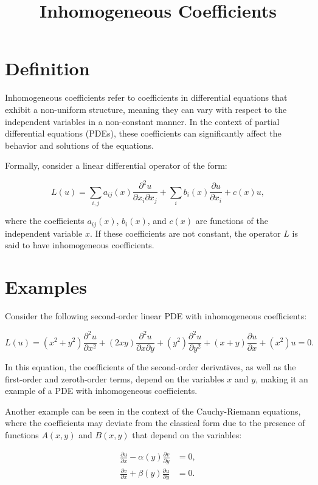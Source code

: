 \documentclass[11pt,a4paper]{article}
\title{Inhomogeneous Coefficients}
\date{}
\begin{document}
\maketitle
\section{Definition}
Inhomogeneous coefficients refer to coefficients in differential equations that exhibit a non-uniform structure, meaning they can vary with respect to the independent variables in a non-constant manner. In the context of partial differential equations (PDEs), these coefficients can significantly affect the behavior and solutions of the equations. 

Formally, consider a linear differential operator of the form:

$$
L(u) = \sum_{i,j} a_{ij}(x) \frac{\partial^2 u}{\partial x_i \partial x_j} + \sum_{i} b_i(x) \frac{\partial u}{\partial x_i} + c(x) u,
$$

where the coefficients $a_{ij}(x)$, $b_i(x)$, and $c(x)$ are functions of the independent variable $x$. If these coefficients are not constant, the operator $L$ is said to have inhomogeneous coefficients.

\section{Examples}
Consider the following second-order linear PDE with inhomogeneous coefficients:

$$
L(u) = (x^2 + y^2) \frac{\partial^2 u}{\partial x^2} + (2xy) \frac{\partial^2 u}{\partial x \partial y} + (y^2) \frac{\partial^2 u}{\partial y^2} + (x + y) \frac{\partial u}{\partial x} + (x^2) u = 0.
$$

In this equation, the coefficients of the second-order derivatives, as well as the first-order and zeroth-order terms, depend on the variables $x$ and $y$, making it an example of a PDE with inhomogeneous coefficients.

Another example can be seen in the context of the Cauchy-Riemann equations, where the coefficients may deviate from the classical form due to the presence of functions $A(x,y)$ and $B(x,y)$ that depend on the variables:

$$
\begin{align*}
\frac{\partial u}{\partial x} - \alpha(y) \frac{\partial v}{\partial y} &= 0, \\
\frac{\partial v}{\partial x} + \beta(y) \frac{\partial u}{\partial y} &= 0.
\end{align*}
$$
\end{document}
